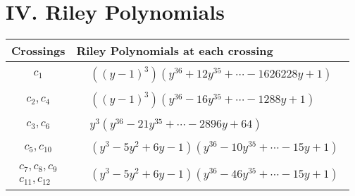\documentclass[1p]{elsarticle_modified}
\theoremstyle{definition}
\begin{document}
\centering \section*{ IV. Riley Polynomials}
\begin{tabular}{m{50pt}|m{274pt}}
Crossings & \hspace{64pt}Riley Polynomials at each crossing \\
\hline $$\begin{aligned}c_{1}\end{aligned}$$&$\begin{aligned}
&((y-1)^3)(y^{36}+12 y^{35}+\cdots-1626228 y+1)
\end{aligned}$\\
\hline $$\begin{aligned}c_{2},c_{4}\end{aligned}$$&$\begin{aligned}
&((y-1)^3)(y^{36}-16 y^{35}+\cdots-1288 y+1)
\end{aligned}$\\
\hline $$\begin{aligned}c_{3},c_{6}\end{aligned}$$&$\begin{aligned}
&y^3(y^{36}-21 y^{35}+\cdots-2896 y+64)
\end{aligned}$\\
\hline $$\begin{aligned}c_{5},c_{10}\end{aligned}$$&$\begin{aligned}
&(y^3-5 y^2+6 y-1)(y^{36}-10 y^{35}+\cdots-15 y+1)
\end{aligned}$\\
\hline $$\begin{aligned}c_{7},c_{8},c_{9}\\c_{11},c_{12}\end{aligned}$$&$\begin{aligned}
&(y^3-5 y^2+6 y-1)(y^{36}-46 y^{35}+\cdots-15 y+1)
\end{aligned}$\\
\hline
\end{tabular}
\vskip 2pc
\end{document}

